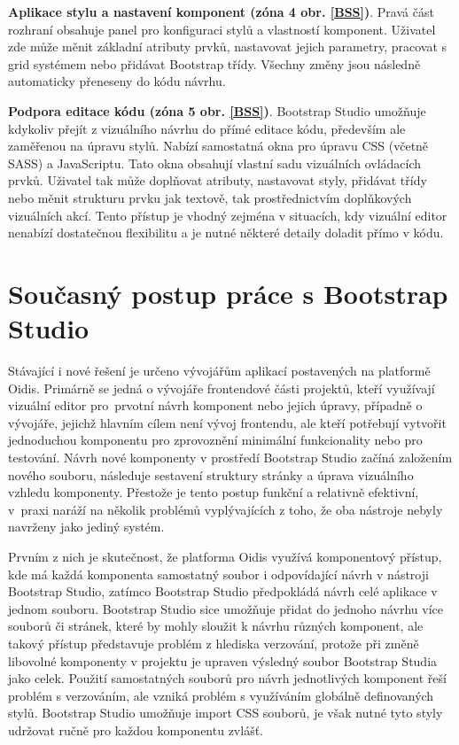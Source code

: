 \textbf{Aplikace stylu a nastavení komponent (zóna 4 obr. \ref{BSS})}. Pravá část rozhraní obsahuje panel pro konfiguraci stylů a vlastností komponent. Uživatel zde může měnit základní atributy prvků, nastavovat jejich parametry, pracovat s grid systémem nebo přidávat Bootstrap třídy. Všechny změny jsou následně automaticky přeneseny do kódu návrhu.

\textbf{Podpora editace kódu (zóna 5 obr. \ref{BSS})}. Bootstrap Studio umožňuje kdykoliv přejít z vizuálního návrhu do přímé editace kódu, především ale zaměřenou na úpravu stylů. Nabízí samostatná okna pro úpravu CSS (včetně SASS) a JavaScriptu. Tato okna obsahují vlastní sadu vizuálních ovládacích prvků. Uživatel tak může doplňovat atributy, nastavovat styly, přidávat třídy nebo měnit strukturu prvku jak textově, tak prostřednictvím doplňkových vizuálních akcí. Tento přístup je vhodný zejména v situacích, kdy vizuální editor nenabízí dostatečnou flexibilitu a je nutné některé detaily doladit přímo v kódu.

\section{Současný postup práce s Bootstrap Studio}
\label{SoucasnyStav}

Stávající i nové řešení je určeno vývojářům aplikací postavených na platformě Oidis. Primárně se jedná o vývojáře frontendové části projektů, kteří využívají vizuální editor pro~prvotní návrh komponent nebo jejich úpravy, případně o vývojáře, jejichž hlavním cílem není vývoj frontendu, ale kteří potřebují vytvořit jednoduchou komponentu pro zprovoznění minimální funkcionality nebo pro testování. Návrh nové komponenty v prostředí Bootstrap Studio začíná založením nového souboru, následuje sestavení struktury stránky a úprava vizuálního vzhledu komponenty. Přestože je tento postup funkční a relativně efektivní, v~praxi naráží na několik problémů vyplývajících z toho, že oba nástroje nebyly navrženy jako jediný systém.

Prvním z nich je skutečnost, že platforma Oidis využívá komponentový přístup, kde má každá komponenta samostatný soubor i odpovídající návrh v nástroji Bootstrap Studio, zatímco Bootstrap Studio předpokládá návrh celé aplikace v jednom souboru. Bootstrap Studio sice umožňuje přidat do jednoho návrhu více souborů či stránek, které by mohly sloužit k návrhu různých komponent, ale takový přístup představuje problém z hlediska verzování, protože při změně libovolné komponenty v projektu je upraven výsledný soubor Bootstrap Studia jako celek. Použití samostatných souborů pro návrh jednotlivých komponent řeší problém s verzováním, ale vzniká problém s využíváním globálně definovaných stylů. Bootstrap Studio umožňuje import CSS souborů, je však nutné tyto styly udržovat ručně pro každou komponentu zvlášť.

